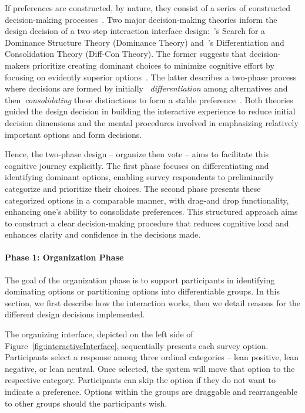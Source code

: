 If preferences are constructed, by nature, they consist of a series of constructed decision-making processes~\cite{lichtensteinConstructionPreference2006}. Two major decision-making theories inform the design decision of a two-step interaction interface design:~\textcite{montgomeryDecisionRulesSearch1983}'s Search for a Dominance Structure Theory (Dominance Theory) and~\textcite{svensonDifferentiationConsolidationTheory1992}'s Differentiation and Consolidation Theory (Diff-Con Theory). The former suggests that decision-makers prioritize creating dominant choices to minimize cognitive effort by focusing on evidently superior options~\cite{montgomeryDecisionRulesSearch1983}. The latter describes a two-phase process where decisions are formed by initially ~\textit{differentiation} among alternatives and then~\textit{consolidating} these distinctions to form a stable preference~\cite{svensonDifferentiationConsolidationTheory1992}. Both theories guided the design decision in building the interactive experience to reduce initial decision dimensions and the mental procedures involved in emphasizing relatively important options and form decisions.

Hence, the two-phase design -- organize then vote -- aims to facilitate this cognitive journey explicitly. The first phase focuses on differentiating and identifying dominant options, enabling survey respondents to preliminarily categorize and prioritize their choices. The second phase presents these categorized options in a comparable manner, with drag-and drop functionality, enhancing one's ability to consolidate preferences. This structured approach aims to construct a clear decision-making procedure that reduces cognitive load and enhances clarity and confidence in the decisions made.

\paragraph{Phase 1: Organization Phase}
The goal of the organization phase is to support participants in identifying dominating options or partitioning options into differentiable groups. In this section, we first describe how the interaction works, then we detail reasons for the different design decisions implemented.

The organizing interface, depicted on the left side of Figure~\ref{fig:interactiveInterface}, sequentially presents each survey option. Participants select a response among three ordinal categories -- lean positive, lean negative, or lean neutral. Once selected, the system will move that option to the respective category. Participants can skip the option if they do not want to indicate a preference. Options within the groups are draggable and rearrangeable to other groups should the participants wish.

